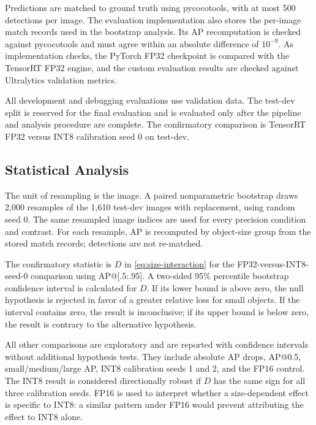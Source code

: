 Predictions are matched to ground truth using pycocotools, with at most 500
detections per image. The evaluation implementation also stores the per-image
match records used in the bootstrap analysis. Its AP recomputation is checked
against pycocotools and must agree within an absolute difference of $10^{-9}$.
As implementation checks, the PyTorch FP32 checkpoint is compared with the
TensorRT FP32 engine, and the custom evaluation results are checked against
Ultralytics validation metrics.

All development and debugging evaluations use validation data. The test-dev
split is reserved for the final evaluation and is evaluated only after the
pipeline and analysis procedure are complete. The confirmatory comparison is
TensorRT FP32 versus INT8 calibration seed 0 on test-dev.

\subsection{Statistical Analysis}
The unit of resampling is the image. A paired nonparametric bootstrap draws
2,000 resamples of the 1,610 test-dev images with replacement, using random
seed 0. The same resampled image indices are used for every precision condition
and contrast. For each resample, AP is recomputed by object-size group from the
stored match records; detections are not re-matched.

The confirmatory statistic is $D$ in \eqref{eq:size-interaction} for the
FP32-versus-INT8-seed-0 comparison using AP@[.5:.95]. A two-sided 95\%
percentile bootstrap confidence interval is calculated for $D$. If its lower
bound is above zero, the null hypothesis is rejected in favor of a greater
relative loss for small objects. If the interval contains zero, the result is
inconclusive; if its upper bound is below zero, the result is contrary to the
alternative hypothesis.

All other comparisons are exploratory and are reported with confidence
intervals without additional hypothesis tests. They include absolute AP drops,
AP@0.5, small/medium/large AP, INT8 calibration seeds 1 and 2, and the FP16
control. The INT8 result is considered directionally robust if $D$ has the same
sign for all three calibration seeds. FP16 is used to interpret whether a
size-dependent effect is specific to INT8: a similar pattern under FP16 would
prevent attributing the effect to INT8 alone.

